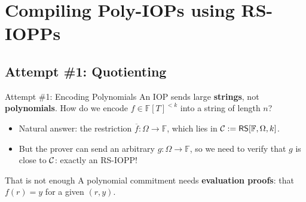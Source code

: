 \documentclass{zkdl-presentation-template}
\begin{document}
    \section{Compiling Poly-IOPs using RS-IOPPs}

    \subsection{Attempt \#1: Quotienting}

    \begin{frame}{Attempt \#1: Encoding Polynomials}
        An IOP sends large \textbf{strings}, not \textbf{polynomials}. How do we encode $f \in \mathbb{F}[T]^{<k}$ into a string of length $n$?
        \pause
        \begin{itemize}
            \item Natural answer: the restriction $\overline{f}: \Omega \to \mathbb{F}$, which lies in $\mathcal{C} := \mathsf{RS}[\mathbb{F},\Omega,k]$.\pause
            \item But the prover can send an arbitrary $g: \Omega \to \mathbb{F}$, so we need to verify that $g$ is close to $\mathcal{C}$: exactly an RS-IOPP!
        \end{itemize}
        \pause

        \begin{alertblock}{That is not enough}
            A polynomial commitment needs \textbf{evaluation proofs}: that $f(r) = y$ for a given $(r, y)$.
        \end{alertblock}
    \end{frame}
\end{document}
